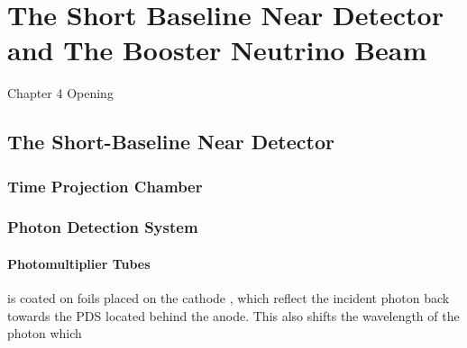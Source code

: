\chapter{The Short Baseline Near Detector and The Booster Neutrino Beam}

\ifpdf
    \graphicspath{{Chapter4/Figs/Raster/}{Chapter4/Figs/PDF/}{Chapter4/Figs/}}
\else
    \graphicspath{{Chapter4/Figs/Vector/}{Chapter4/Figs/}}
\fi


Chapter 4 Opening

\newpage

\section{The Short-Baseline Near Detector}



\subsection{Time Projection Chamber}

\subsection{Photon Detection System}

\subsubsection{Photomultiplier Tubes}
is coated on foils placed on the cathode
, which reflect the incident photon back towards the PDS located behind the anode. 
This also shifts the wavelength of the photon which 


